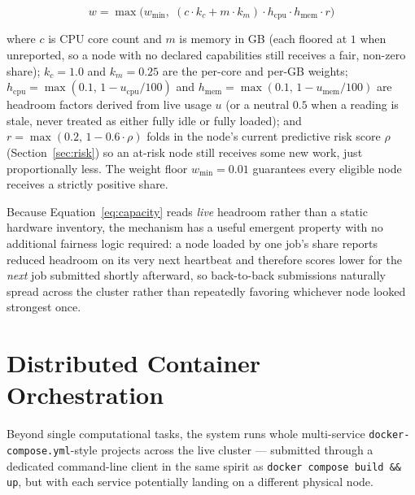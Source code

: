 \documentclass[conference]{IEEEtran}
\begin{document}
\begin{equation}
w = \max\Big(w_{\min},\; (c \cdot k_c + m \cdot k_m) \cdot h_{\mathrm{cpu}} \cdot h_{\mathrm{mem}} \cdot r\Big)
\label{eq:capacity}
\end{equation}

where $c$ is CPU core count and $m$ is memory in GB (each floored at $1$ when unreported, so a node
with no declared capabilities still receives a fair, non-zero share); $k_c=1.0$ and $k_m=0.25$ are the
per-core and per-GB weights; $h_{\mathrm{cpu}}=\max(0.1,\,1-u_{\mathrm{cpu}}/100)$ and
$h_{\mathrm{mem}}=\max(0.1,\,1-u_{\mathrm{mem}}/100)$ are headroom factors derived from live usage
$u$ (or a neutral $0.5$ when a reading is stale, never treated as either fully idle or fully loaded);
and $r=\max(0.2,\,1-0.6\cdot\rho)$ folds in the node's current predictive risk score $\rho$
(Section~\ref{sec:risk}) so an at-risk node still receives some new work, just proportionally less.
The weight floor $w_{\min}=0.01$ guarantees every eligible node receives a strictly positive share.

Because Equation~\ref{eq:capacity} reads \emph{live} headroom rather than a static hardware
inventory, the mechanism has a useful emergent property with no additional fairness logic required: a
node loaded by one job's share reports reduced headroom on its very next heartbeat and therefore
scores lower for the \emph{next} job submitted shortly afterward, so back-to-back submissions
naturally spread across the cluster rather than repeatedly favoring whichever node looked strongest
once.

\section{Distributed Container Orchestration}
\label{sec:docker}

Beyond single computational tasks, the system runs whole multi-service
\texttt{docker-compose.yml}-style projects across the live cluster — submitted through a dedicated
command-line client in the same spirit as \texttt{docker compose build \&\& up}, but with each
service potentially landing on a different physical node.
\end{document}
